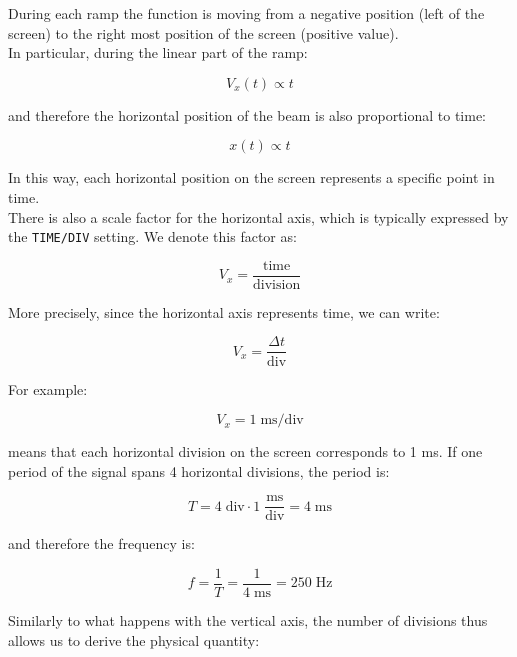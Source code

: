 \documentclass[../main.tex]{subfiles}
\begin{document}
During each ramp the function is moving from a negative position (left of the screen) to the right most position of the screen (positive value).\\

In particular, during the linear part of the ramp:

\begin{equation}
	V_x(t)\propto t
\end{equation}

and therefore the horizontal position of the beam is also proportional to time:

\begin{equation}
	x(t)\propto t
\end{equation}

In this way, each horizontal position on the screen represents a specific point in time.\\

There is also a scale factor for the horizontal axis, which is typically expressed by the \texttt{TIME/DIV} setting. We denote this factor as:

\begin{equation}
	V_x=\frac{\text{time}}{\text{division}}
\end{equation}

More precisely, since the horizontal axis represents time, we can write:

\begin{equation}
	V_x=\frac{\Delta t}{\text{div}}
\end{equation}

For example:

\begin{equation}
	V_x=1 \; \text{ms/div}
\end{equation}

means that each horizontal division on the screen corresponds to 1 ms. If one period of the signal spans 4 horizontal divisions, the period is:

\begin{equation}
	T = 4 \;\text{div}\cdot1 \; \frac{\text{ms}}{\text{div}}
= 4 \; \text{ms}
\end{equation}

and therefore the frequency is:

\begin{equation}
	f=\frac{1}{T}
	=\frac{1}{4 \; \text{ms}}
	=250 \; \text{Hz}
\end{equation}

Similarly to what happens with the vertical axis, the number of divisions thus allows us to derive the physical quantity:
\end{document}
